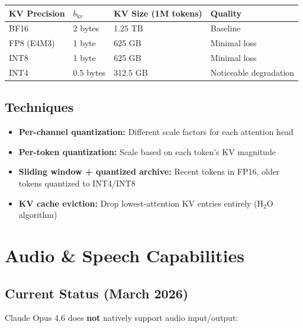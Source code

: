 \documentclass[11pt,a4paper]{article}
\begin{document}
\begin{center}
\begin{tabular}{llll}
\toprule
\textbf{KV Precision} & $b_{\text{kv}}$ & \textbf{KV Size (1M tokens)} & \textbf{Quality} \\
\midrule
BF16 & 2 bytes & 1.25 TB & Baseline \\
FP8 (E4M3) & 1 byte & 625 GB & Minimal loss \\
INT8 & 1 byte & 625 GB & Minimal loss \\
INT4 & 0.5 bytes & 312.5 GB & Noticeable degradation \\
\bottomrule
\end{tabular}
\end{center}

\subsection{Techniques}

\begin{itemize}[itemsep=1pt]
  \item \textbf{Per-channel quantization:} Different scale factors for each attention head
  \item \textbf{Per-token quantization:} Scale based on each token's KV magnitude
  \item \textbf{Sliding window + quantized archive:} Recent tokens in FP16, older tokens quantized to INT4/INT8
  \item \textbf{KV cache eviction:} Drop lowest-attention KV entries entirely (H$_2$O algorithm)
\end{itemize}

\section{Audio \& Speech Capabilities}

\subsection{Current Status (March 2026)}

Claude Opus 4.6 does \textbf{not} natively support audio input/output:
\end{document}
